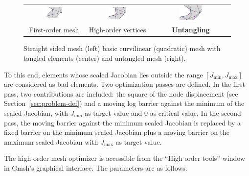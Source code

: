 \documentclass[12pt,a4paper,a4wide]{article}
\begin{document}
\begin{figure}
  \begin{center}
  \begin{tabular}{ccc}
  \includegraphics[width=0.3\textwidth]{untangling/linear} &
  \includegraphics[width=0.3\textwidth]{untangling/p2_bad} &
  \includegraphics[width=0.3\textwidth]{untangling/p2}\\
  First-order mesh & High-order vertices &\textbf{Untangling}
  \end{tabular}
\end{center}
\caption{Straight sided mesh (left) basic curvilinear (quadratic)
mesh with tangled elements (center) and untangled mesh (right).
\label{fig:untangling}}
\end{figure}

To this end, elements whose scaled Jacobian lies outside the
range $[J_{\min}, J_{\max}]$ are considered as bad elements. Two
optimization passes are defined. In the first pass, two
contributions are included: the square of the node displacement
(see Section~\ref{sec:problem-def}) and a moving log barrier against
the minimum of the scaled Jacobian, with $J_{\min}$ as target value
and $0$ as critical value. In the second pass, the moving barrier
against the minimum scaled Jacobian is replaced by a fixed barrier
on the minimum scaled Jacobian plus a moving barrier on the maximum
scaled Jacobian with $J_{\max}$ as target value.


The high-order mesh optimizer is accessible from the ``High order
tools'' window in Gmsh's graphical interface. The parameters are
as follows:
\end{document}
